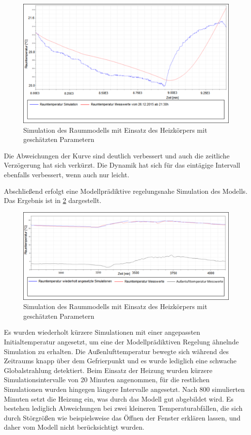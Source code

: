 \begin{figure}
\centering
\includegraphics[width=\textwidth]{abbildungen/20160330_validierung2pe}
\caption{Simulation des Raummodells mit Einsatz des Heizkörpers mit geschätzten Parametern}
\label{fig:valid2pe}
\end{figure}

Die Abweichungen der Kurve sind deutlich verbessert und auch die zeitliche Verzögerung hat sich verkürzt. Die Dynamik hat sich für das eintägige Intervall ebenfalls verbessert, wenn auch nur leicht. 

Abschließend erfolgt eine Modellprädiktive regelungsnahe Simulation des Modells. Das Ergebnis ist in \ref{fig:bench} dargestellt.

\begin{figure}
\centering
\includegraphics[width=\textwidth]{abbildungen/20160330_benchmark}
\caption{Simulation des Raummodells mit Einsatz des Heizkörpers mit geschätzten Parametern}
\label{fig:bench}
\end{figure}

Es wurden wiederholt kürzere Simulationen mit einer angepassten Initialtemperatur angesetzt, um eine der Modellprädiktiven Regelung ähnelnde Simulation zu erhalten. Die Außenlufttemperatur bewegte sich während des Zeitraums knapp über dem Gefrierpunkt und es wurde lediglich eine schwache Globalstrahlung detektiert. Beim Einsatz der Heizung wurden kürzere Simulationsintervalle von 20 Minuten angenommen, für die restlichen Simulationen wurden hingegen längere Intervalle angesetzt.
Nach 800 simulierten Minuten setzt die Heizung ein, was durch das Modell gut abgebildet wird. Es bestehen lediglich Abweichungen bei zwei kleineren Temperaturabfällen, die sich durch Störgrößen wie beispielsweise das Öffnen der Fenster erklären lassen, und daher vom Modell nicht berücksichtigt wurden.

